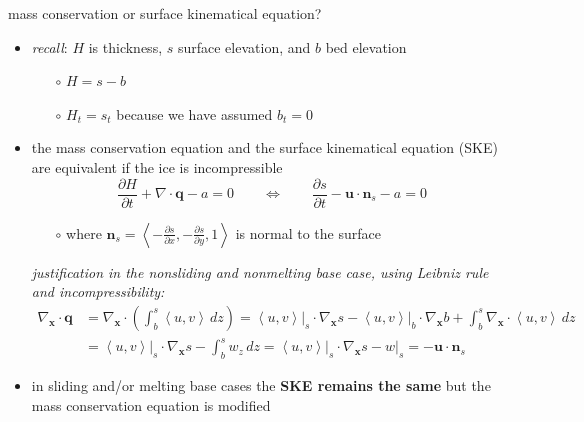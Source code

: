 \documentclass[10pt,hyperref,dvipsnames]{beamer}
\newcommand{\bn}{\mathbf{n}}
\newcommand{\bq}{\mathbf{q}}
\newcommand{\bx}{\mathbf{x}}
\newcommand{\bu}{\mathbf{u}}
\newcommand{\grad}{\nabla}
\newcommand{\Div}{\nabla\cdot}
\newcommand{\Divbx}{\nabla_{\bx}\cdot}
\begin{document}
\begin{frame}{mass conservation or surface kinematical equation?}
\begin{itemize}
\item \emph{recall}: $H$ is thickness, $s$ surface elevation, and $b$ bed elevation
    \begin{itemize}
    \item[$\circ$] $H=s-b$
    \item[$\circ$] $H_t=s_t$ because we have assumed $b_t=0$
    \end{itemize}
\item the mass conservation equation and the surface kinematical equation (SKE) are equivalent if the ice is incompressible
    $$\frac{\partial H}{\partial t} + \Div \bq - a = 0 \qquad \iff \qquad \frac{\partial s}{\partial t} - \bu \cdot \bn_s - a = 0$$
    \begin{itemize}
    \item[$\circ$] where $\bn_s = \left<-\frac{\partial s}{\partial x},-\frac{\partial s}{\partial y},1\right>$ is normal to the surface
    \end{itemize}

\bigskip
\scriptsize
\item[] \emph{justification in the nonsliding and nonmelting base case, using Leibniz rule and incompressibility:}
\begin{align*}
\Divbx \bq &= \Divbx \left(\int_b^s \left<u,v\right>\,dz\right) = \left<u,v\right>\big|_s \cdot \grad_{\bx} s - \left<u,v\right>\big|_b \cdot \grad_{\bx} b + \int_b^s \Divbx \left<u,v\right>\,dz \\
           &= \left<u,v\right>\big|_s \cdot \grad_{\bx} s - \int_b^s w_z\,dz = \left<u,v\right>\big|_s \cdot \grad_{\bx} s - w\big|_s = - \bu \cdot \bn_s
\end{align*}

\medskip
\normalsize
\item in sliding and/or melting base cases the \textbf{SKE remains the same} but the mass conservation equation is modified
\end{itemize}
\end{frame}
\end{document}
